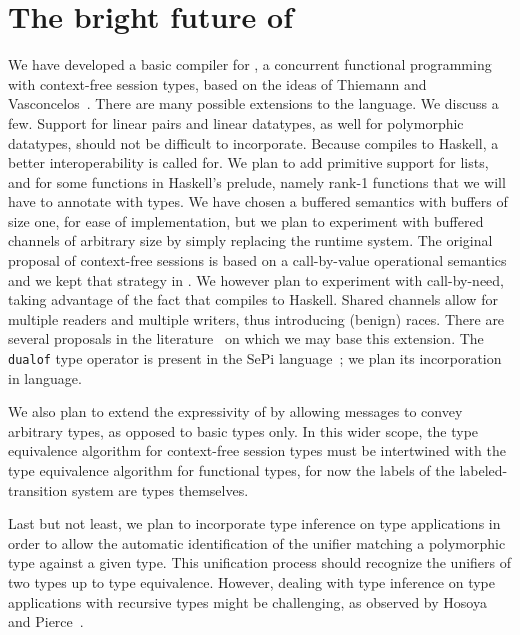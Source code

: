 \section{The bright future of \freest{}}
\label{sec:conclusion}

We have developed a basic compiler for \freest, a concurrent
functional programming with context-free session types, based on the
ideas of Thiemann and Vasconcelos~\cite{DBLP:conf/icfp/ThiemannV16}.
%
There are many possible extensions to the language. We discuss a
few.
%
Support for linear pairs and linear datatypes, as well for polymorphic
datatypes, should not be difficult to incorporate.
%
Because \freest{} compiles to Haskell, a better interoperability is
called for. We plan to add primitive support for lists, and for some
functions in Haskell's prelude, namely rank-1 functions that we will
have to annotate with \freest{} types.
%
We have chosen a buffered semantics with buffers of size one, for ease
of implementation, but we plan to experiment with buffered channels of
arbitrary size by simply replacing the runtime system.
%
The original proposal of context-free sessions is based on a
call-by-value operational semantics and we kept that strategy in
\freest. We however plan to experiment with call-by-need, taking
advantage of the fact that \freest{} compiles to Haskell.
%
Shared channels allow for multiple readers and multiple writers,
thus introducing (benign) races. There are several proposals in the
literature~\cite{DBLP:journals/pacmpl/BalzerP17,
  DBLP:conf/sefm/FrancoV13,Lindley.Morris_Lightweight.functional.session.types,DBLP:journals/iandc/Vasconcelos12}
on which we may base this extension.
%
The \lstinline|dualof| type operator is present in the SePi
language~\cite{DBLP:conf/sefm/FrancoV13}; we plan its incorporation in
\freest{} language.

We also plan to extend the expressivity of \freest{} by allowing
messages to convey arbitrary types, as opposed to basic types only.
In this wider scope, the type equivalence algorithm for context-free
session types must be intertwined with the type equivalence algorithm
for functional types, for now the labels of the labeled-transition
system are types themselves.

Last but not least, we plan to incorporate type inference on type
applications in order to allow the automatic identification of the
unifier matching a polymorphic type against a given type. This
unification process should recognize the unifiers of two types up to
type equivalence. However, dealing with type inference on type
applications with recursive types might be challenging, as observed by
Hosoya and Pierce~\cite{DBLP:journals/toplas/PierceT00}.

